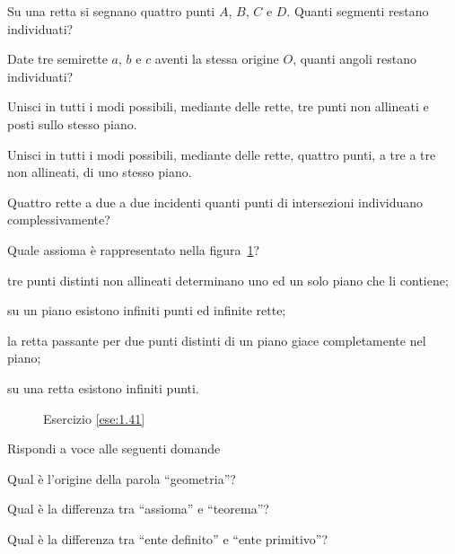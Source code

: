 \begin{esercizio}
\label{ese:1.36}
Su una retta si segnano quattro punti $A$, $B$, $C$ e $D$. Quanti segmenti restano individuati?
\end{esercizio}

\begin{esercizio}
\label{ese:1.37}
Date tre semirette $a$, $b$ e $c$ aventi la stessa origine $O$, quanti angoli restano individuati?
\end{esercizio}

\begin{esercizio}
\label{ese:1.38}
Unisci in tutti i modi possibili, mediante delle rette, tre punti non allineati e posti sullo stesso piano.
\end{esercizio}

\begin{esercizio}
\label{ese:1.39}
Unisci in tutti i modi possibili, mediante delle rette, quattro punti, a tre a tre non allineati, di uno stesso piano.
\end{esercizio}

\begin{esercizio}
\label{ese:1.40}
Quattro rette a due a due incidenti quanti punti di intersezioni individuano complessivamente?
\end{esercizio}

\begin{esercizio}
\label{ese:1.41}
Quale assioma è rappresentato nella figura~\ref{fig:ese1.41}?
\begin{enumeratea}
\item tre punti distinti non allineati determinano uno ed un solo piano che li contiene;
\item su un piano esistono infiniti punti ed infinite rette;
\item la retta passante per due punti distinti di un piano giace completamente nel piano;
\item su una retta esistono infiniti punti.
\end{enumeratea}
\end{esercizio}

\begin{figure}[htb]
 \centering
 \caption{Esercizio \ref{ese:1.41}}\label{fig:ese1.41}
\end{figure}

\begin{esercizio}
\label{ese:1.42}
Rispondi a voce alle seguenti domande
\begin{enumeratea}
\item Qual è l'origine della parola ``geometria''?
\item Qual è la differenza tra ``assioma'' e ``teorema''?
\item Qual è la differenza tra ``ente definito'' e ``ente primitivo''?
\end{enumeratea}
\end{esercizio}

